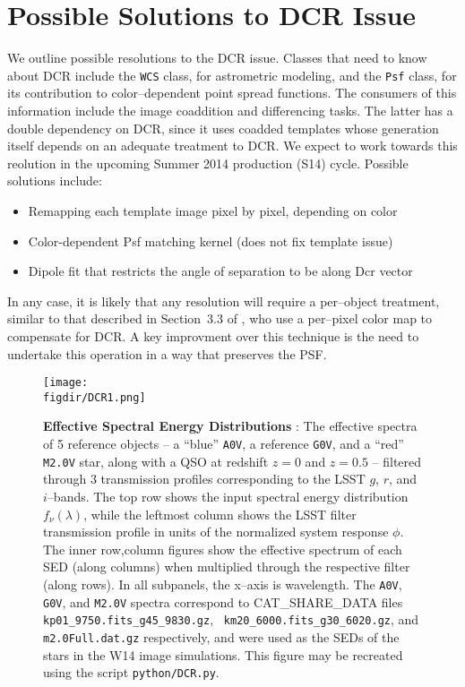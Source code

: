 \documentclass[prd, nofootinbib, floatfix, 11pt, tightenlines, times]{article}
\def\figdir{../figures}
\begin{document}
\section{Possible Solutions to DCR Issue}

We outline possible resolutions to the DCR issue.  Classes that need
to know about DCR include the {\tt WCS} class, for astrometric
modeling, and the {\tt Psf} class, for its contribution to
color--dependent point spread functions.  The consumers of this
information include the image coaddition and differencing tasks.  The
latter has a double dependency on DCR, since it uses coadded
templates whose generation itself depends on an adequate treatment to
DCR.  We expect to work towards this reolution in the upcoming Summer
2014 production (S14) cycle.  Possible solutions include:

\begin{itemize}
\item Remapping each template image pixel by pixel, depending on color
\item Color-dependent Psf matching kernel (does not fix template issue)
\item Dipole fit that restricts the angle of separation to be along Dcr vector
\end{itemize}

In any case, it is likely that any resolution will require a
per--object treatment, similar to that described in Section~3.3 of
\cite{1999ApJ...521..602A}, who use a per--pixel color map to
compensate for DCR.  A key improvment over this technique is the need
to undertake this operation in a way that preserves the PSF.


\clearpage
\begin{figure}[h!]
  \centering
  \texttt{[image: \\figdir/DCR1.png]}
  \caption{{\bf Effective Spectral Energy Distributions} : The
    effective spectra of 5 reference objects -- a ``blue'' {\tt A0V},
    a reference {\tt G0V}, and a ``red'' {\tt M2.0V} star, along with
    a QSO at redshift $z=0$ and $z=0.5$ -- filtered through 3
    transmission profiles corresponding to the LSST $g$, $r$, and
    $i$--bands.  The top row shows the input spectral energy
    distribution $f_\nu(\lambda)$, while the leftmost column shows the
    LSST filter transmission profile in units of the normalized
    system response $\phi$.  The inner row,column figures show the
    effective spectrum of each SED (along columns) when multiplied
    through the respective filter (along rows).  In all subpanels, the
    x--axis is wavelength.  The {\tt A0V}, {\tt G0V}, and {\tt M2.0V}
    spectra correspond to {CAT\_SHARE\_DATA} files {\tt
      kp01\_9750.fits\_g45\_9830.gz}, {\tt
      km20\_6000.fits\_g30\_6020.gz}, and {\tt m2.0Full.dat.gz}
    respectively, and were used as the SEDs of the stars in the W14
    image simulations.  This figure may be recreated using the script
    {\tt python/DCR.py}.}
  \label{fig:spectra}
\end{figure}
\end{document}
